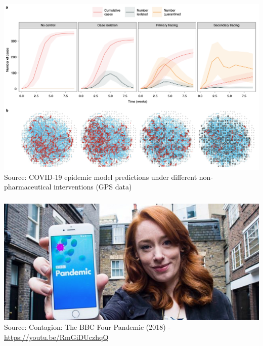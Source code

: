 \documentclass[8pt]{beamer}
\begin{document}

\begin{frame}
\frametitle{\insertsection}
\centering
\includegraphics[width=\linewidth,height=0.9\textheight,keepaspectratio]{covid_network}\\
\tiny Source: COVID-19 epidemic model predictions under different non-pharmaceutical interventions (GPS data) \cite{Firth2020}
\end{frame}



\begin{frame}
\frametitle{\insertsection}
\centering
\includegraphics[width=0.8\linewidth]{bbc_pandemic}\\
\tiny Source: Contagion: The BBC Four Pandemic (2018) - \url{https://youtu.be/RmGiDUczhqQ}
\end{frame}
\end{document}
